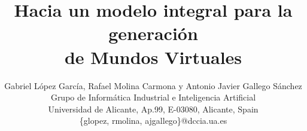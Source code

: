 \documentclass{egpubl}
\begin{document}
\title[Hacia un modelo integral para la generaci\'on de Mundos Virtuales]%
      {Hacia un modelo integral para la generaci\'on\\de Mundos Virtuales}

\author[G. L\'opez, R. Molina \& A. J. Gallego]
       {Gabriel L\'opez Garc\'ia, Rafael Molina Carmona y Antonio Javier Gallego
       S\'anchez\\
       Grupo de Inform\'atica Industrial e Inteligencia Artificial\\
        Universidad de Alicante, Ap.99, E-03080, Alicante, Spain\\
        \{glopez, rmolina, ajgallego\}@dccia.ua.es}



\maketitle
\end{document}
